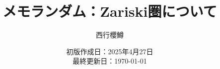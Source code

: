 \newcommand{\CATEGORY}{メモランダム}%
\newcommand{\TITLE}{Zariski圏について}
\newcommand{\AUTHORNAME}{西行櫻鱒}
\newcommand{\CREATEDAT}{2025年4月27日}

\title{\CATEGORY：\TITLE}
\author{\AUTHORNAME}
\date{初版作成日：\CREATEDAT\\最終更新日：\today\\}

